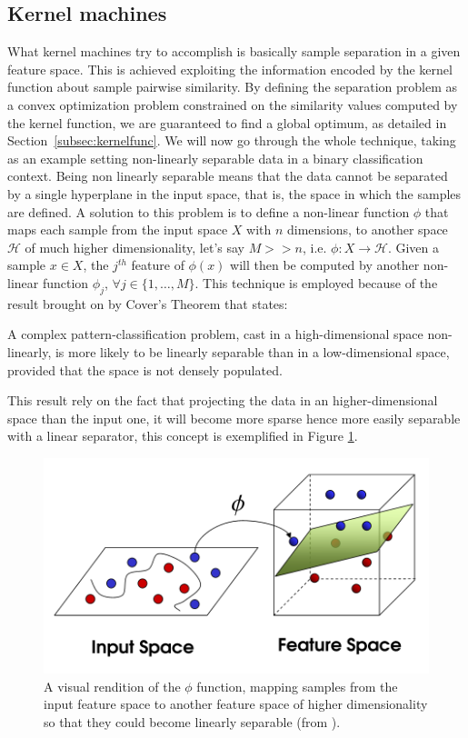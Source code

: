 \subsection{Kernel machines}
\label{subsec:kmachines}

What kernel machines try to accomplish is basically sample separation in a given
feature space.
This is achieved exploiting the information encoded by the kernel function about
sample pairwise similarity. By defining the separation problem as a convex optimization
problem constrained on the similarity values computed by the kernel function,
we are guaranteed to find a global optimum, as detailed in Section~\ref{subsec:kernelfunc}.
We will now go through the whole technique, taking as an example setting non-linearly
separable data in a binary classification context.
Being non linearly separable means that the data cannot be separated by a single
hyperplane in the input space, that is, the space in which the samples are defined.
A solution to this problem is to define a non-linear function $\phi$ that maps each
sample from the input space $X$ with $n$ dimensions, to another space $\mathcal{H}$
of much higher dimensionality, let's say $M >> n$, i.e. $\phi:X\to \mathcal{H}$.
Given a sample $x \in X$, the $j^{th}$ feature of $\phi(x)$ will then be
computed by another non-linear function $\phi_j$, $\forall j \in \{1,\dots,M\}$.
This technique is employed because of the result brought on by Cover's Theorem
that states:

\begin{theorem}
    A complex pattern-classification problem, cast in a high-dimensional space
    non-linearly, is more likely to be linearly separable than in a low-dimensional
    space, provided that the space is not densely populated.
\end{theorem}

This result rely on the fact that projecting the data in an higher-dimensional
space than the input one, it will become more sparse hence more easily separable
with a linear separator, this concept is exemplified in Figure \ref{fig:phi}.

\begin{figure}[ht]
    \centering
    \includegraphics[scale=0.4]{Figures/phi}
    \caption{A visual rendition of the $\phi$ function, mapping samples from the
    input feature space to another feature space of higher dimensionality so that
    they could become linearly separable (from \cite{rtesselli}).}
    \label{fig:phi}
\end{figure}


